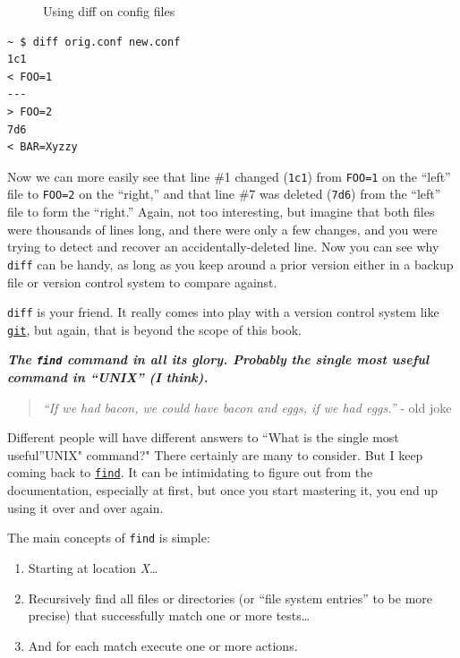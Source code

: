 \documentclass[10pt,]{book}
\numberwithin{figure}{chapter}
\DeclareRobustCommand{\drcap}[1]{\begin{figure}[H]\caption{#1}\end{figure}}
\DeclareRobustCommand{\drcmd}[1]{\index{Commands!#1}}
\begin{document}
\drcap{Using diff on config files}

\begin{verbatim}
~ $ diff orig.conf new.conf
1c1
< FOO=1
---
> FOO=2
7d6
< BAR=Xyzzy
\end{verbatim}

Now we can more easily see that line \#1 changed (\texttt{1c1}) from
\texttt{FOO=1} on the ``left'' file to \texttt{FOO=2} on the ``right,''
and that line \#7 was deleted (\texttt{7d6}) from the ``left'' file to
form the ``right.'' Again, not too interesting, but imagine that both
files were thousands of lines long, and there were only a few changes,
and you were trying to detect and recover an accidentally-deleted line.
Now you can see why \texttt{diff} can be handy, as long as you keep
around a prior version either in a backup file or version control system
to compare against.

\texttt{diff} is your friend. It really comes into play with a version
control system like
\href{http://linux.die.net/man/1/git}{\texttt{git}}\drcmd{git}, but
again, that is beyond the scope of this book.


\textbf{\emph{The \texttt{find} command in all its glory. Probably the
single most useful command in ``UNIX'' (I think).}}

\begin{quote}
\emph{``If we had bacon, we could have bacon and eggs, if we had
eggs.''} - old joke
\end{quote}

Different people will have different answers to ``What is the single
most useful''UNIX" command?" There certainly are many to consider. But I
keep coming back to
\href{http://linux.die.net/man/1/find}{\texttt{find}}. It can be
intimidating to figure out from the documentation, especially at first,
but once you start mastering it, you end up using it over and over
again.

The main concepts of \texttt{find} is simple:

\begin{enumerate}
\def\labelenumi{\arabic{enumi}.}
\item
  Starting at location \emph{X}\ldots{}
\item
  Recursively find all files or directories (or ``file system entries''
  to be more precise) that successfully match one or more tests\ldots{}
\item
  And for each match execute one or more actions.
\end{enumerate}
\end{document}
